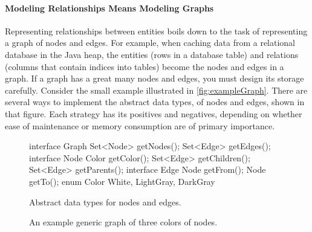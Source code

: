 \paragraph{Modeling Relationships Means Modeling Graphs}
Representing relationships between entities boils down to the task of
representing a graph of nodes and edges. For example, when caching data from a
relational database in the Java heap, the entities (rows in a database table)
and relations (columns that contain indices into tables) become the nodes and
edges in a graph.
If a graph has a great many nodes and edges, you must design its storage
carefully. Consider the small example illustrated in 
\autoref{fig:exampleGraph}. There are several ways to implement the abstract
data types, of nodes and edges, shown in that figure. Each strategy has its
positives and negatives, depending on whether ease of maintenance or memory
consumption are of primary importance.

\begin{figure}
\centering
{}
\qquad
\begin{subfloat}
\label{fig:graph-interfaces}
\begin{minipage}[b]{0.45\textwidth}
\begin{figurelisting}
interface Graph {
	Set<Node> getNodes();
	Set<Edge> getEdges();
}
interface Node {
	Color getColor();
	Set<Edge> getChildren();
	Set<Edge> getParents();
}
interface Edge {
	Node getFrom();
	Node getTo();
}
enum Color {
	White, LightGray, DarkGray
}
\end{figurelisting}
\end{minipage}
\caption{Abstract data types for nodes and edges.}
\end{subfloat}
	\caption{An example generic graph of three colors of nodes.}
	\label{fig:exampleGraph}
\end{figure}

